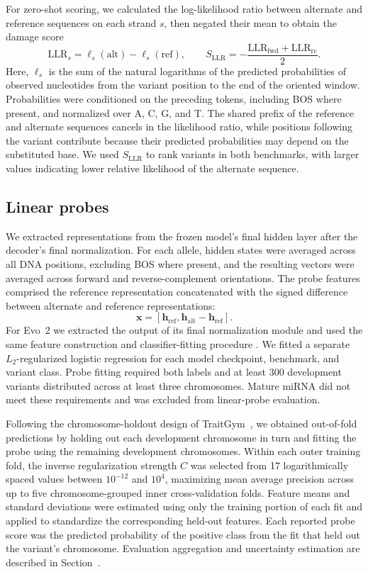 \documentclass[a4paper,num-refs]{oup-contemporary}
\begin{document}
For zero-shot scoring, we calculated the log-likelihood ratio
between alternate and reference sequences on each strand $s$,
then negated their mean to obtain the damage score
\[
\mathrm{LLR}_s =
    \ell_s(\mathrm{alt})-\ell_s(\mathrm{ref}),
\qquad
S_{\mathrm{LLR}} =
    -\frac{\mathrm{LLR}_{\mathrm{fwd}}
           +\mathrm{LLR}_{\mathrm{rc}}}{2}.
\]
Here, $\ell_s$ is the sum of the natural logarithms of the
predicted probabilities of observed nucleotides from the variant
position to the end of the oriented window.
Probabilities were conditioned on the preceding tokens, including BOS
where present, and normalized over A, C, G, and T.
The shared prefix of the reference and alternate sequences
cancels in the likelihood ratio, while positions following the
variant contribute because their predicted probabilities may
depend on the substituted base.
We used $S_{\mathrm{LLR}}$ to rank variants in both benchmarks,
with larger values indicating lower relative likelihood of the
alternate sequence.

\subsection{Linear probes}
\label{methods:probes}

We extracted representations from the frozen model's final hidden
layer after the decoder's final normalization.
For each allele, hidden states were averaged across all DNA
positions, excluding BOS where present, and the resulting vectors
were averaged across forward and reverse-complement orientations.
The probe features comprised the reference representation
concatenated with the signed difference between alternate and
reference representations:
\[
\mathbf{x} =
\left[
\mathbf{h}_{\mathrm{ref}},
\mathbf{h}_{\mathrm{alt}}-\mathbf{h}_{\mathrm{ref}}
\right].
\]
For Evo~2 we extracted the output of its final normalization module
and used the same feature construction and classifier-fitting procedure
\citep{marindnaevo2code}.
We fitted a separate $L_2$-regularized logistic regression for
each model checkpoint, benchmark, and variant class.
Probe fitting required both labels and at least 300 development
variants distributed across at least three chromosomes.
Mature miRNA did not meet these requirements and was excluded
from linear-probe evaluation.

Following the chromosome-holdout design of
TraitGym~\citep{benegas2025traitgym,marindnabencheval},
we obtained out-of-fold predictions by holding out each
development chromosome in turn and fitting the probe using the
remaining development chromosomes.
Within each outer training fold, the inverse regularization
strength $C$ was selected from 17 logarithmically spaced values
between $10^{-12}$ and $10^4$, maximizing mean average precision
across up to five chromosome-grouped inner cross-validation folds.
Feature means and standard deviations were estimated using only
the training portion of each fit and applied to standardize the
corresponding held-out features.
Each reported probe score was the predicted probability of the
positive class from the fit that held out the variant's chromosome.
Evaluation aggregation and uncertainty estimation are described
in Section~.
\end{document}
